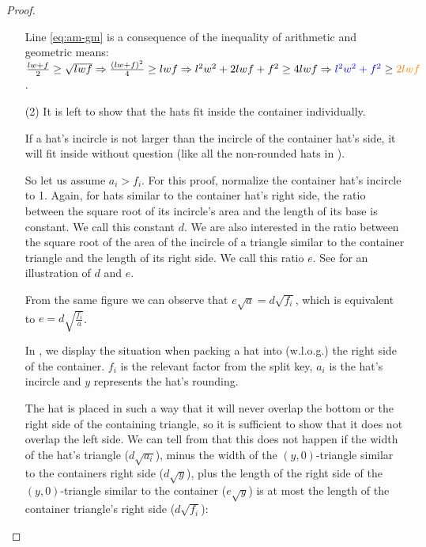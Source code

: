 \documentclass[a4paper,style=print,bibliography=totoc,nexus,lnum,extramargin]{tubsbook}
\begin{document}
\begin{proof}
\begin{itemize}
            Line \ref{eq:am-gm} is a consequence of the inequality of arithmetic and geometric means: $\frac{lw+f}{2} \ge \sqrt{lwf} \Rightarrow \frac{(lw+f)^2}{4} \ge lwf \Rightarrow l^2w^2 + 2 lwf + f^2 \ge 4 lwf \Rightarrow \textcolor{blue}{l^2w^2 + f^2} \ge \textcolor{orange}{2lwf}$.

        \item[(2)]
            It is left to show that the hats fit inside the container individually.

            If a hat's incircle is not larger than the incircle of the container hat's side, it will fit inside without question (like all the non-rounded hats in ).

            So let us assume $a_i > f_i$. For this proof, normalize the container hat's incircle to 1. Again, for hats similar to the container hat's right side, the ratio between the square root of its incircle's area and the length of its base is constant. We call this constant $d$.
            We are also interested in the ratio between the square root of the area of the incircle of a triangle similar to the container triangle and the length of its right side. We call this ratio $e$. See  for an illustration of $d$ and $e$.


            From the same figure we can observe that
            $e\sqrt{a} = d\sqrt{f_i}$, which is equivalent to $e = d\sqrt{\frac{f_i}{a}}$.


            In , we display the situation when packing a hat into (w.l.o.g.) the right side of the container. $f_i$ is the relevant factor from the split key, $a_i$ is the hat's incircle and $y$ represents the hat's rounding.


            The hat is placed in such a way that it will never overlap the bottom or the right side of the containing triangle, so it is sufficient to show that it does not overlap the left side.
            We can tell from  that this does not happen if the width of the hat's triangle ($d\sqrt{a_i}$), minus the width of the $(y,0)$-triangle similar to the containers right side ($d\sqrt{y}$), plus the length of the right side of the $(y,0)$-triangle similar to the container ($e\sqrt{y}$) is at most the length of the container triangle's right side ($d\sqrt{f_i}$):


\end{itemize}
\end{proof}
\end{document}
